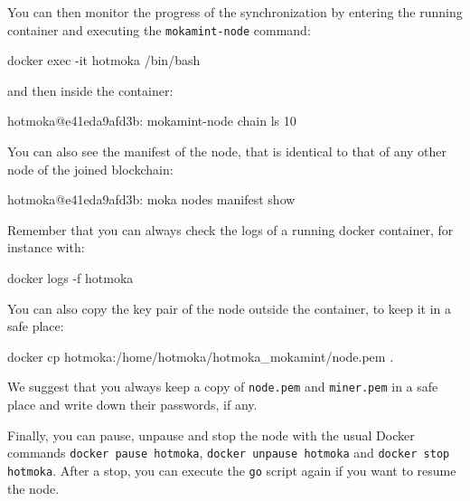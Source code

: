 You can then monitor the progress of the synchronization by entering the running container
and executing the \texttt{mokamint-node} command:
%
\begin{shellcommandbox}\begin{ttlst}
docker exec -it hotmoka /bin/bash
\end{ttlst}\end{shellcommandbox}
%
and then inside the container:
%
\begin{shellcommandbox}\begin{ttlst}
hotmoka@e41eda9afd3b: mokamint-node chain ls 10
\end{ttlst}\end{shellcommandbox}
%
You can also see the manifest of the node, that is identical to that of any other node of the joined blockchain:
%
\begin{shellcommandbox}\begin{ttlst}
hotmoka@e41eda9afd3b: moka nodes manifest show
\end{ttlst}\end{shellcommandbox}
%
Remember that you can always check the logs of a running docker container, for instance with:
%
\begin{shellcommandbox}\begin{ttlst}
docker logs -f hotmoka
\end{ttlst}\end{shellcommandbox}
%
You can also copy the key pair of the node outside the container, to keep it in a safe place:
%
\begin{shellcommandbox}\begin{ttlst}
docker cp hotmoka:/home/hotmoka/hotmoka_mokamint/node.pem .
\end{ttlst}\end{shellcommandbox}
%
We suggest that you always keep a copy of \texttt{node.pem} and \texttt{miner.pem} in a safe
place and write down their passwords, if any.

Finally, you can pause, unpause and stop the node with the usual Docker commands
\texttt{docker pause hotmoka}, \texttt{docker unpause hotmoka} and
\texttt{docker stop hotmoka}. After a stop, you can execute the \texttt{go} script
again if you want to resume the node.

